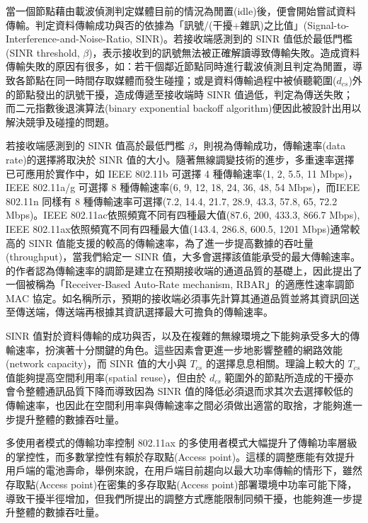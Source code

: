 \documentclass[12pt,a4paper]{article}
\begin{document}
\begin{description}
當一個節點藉由載波偵測判定媒體目前的情況為閒置(idle)後，便會開始嘗試資料傳輸。判定資料傳輸成功與否的依據為「訊號/(干擾+雜訊)之比值」(Signal-to-Interference-and-Noise-Ratio, SINR)。若接收端感測到的 SINR 值低於最低門檻(SINR threshold, $\beta$)，表示接收到的訊號無法被正確解讀導致傳輸失敗。造成資料傳輸失敗的原因有很多，如：若干個鄰近節點同時進行載波偵測且判定為閒置，導致各節點在同一時間存取媒體而發生碰撞；或是資料傳輸過程中被偵聽範圍($d_{cs}$)外的節點發出的訊號干擾，造成傳遞至接收端時 SINR 值過低，判定為傳送失敗；而二元指數後退演算法(binary exponential backoff algorithm)便因此被設計出用以解決競爭及碰撞的問題。

若接收端感測到的 SINR 值高於最低門檻 $\beta$，則視為傳輸成功，傳輸速率(data rate)的選擇將取決於 SINR 值的大小。隨著無線調變技術的進步，多重速率選擇已可應用於實作中，如 IEEE 802.11b 可選擇 4 種傳輸速率(1, 2, 5.5, 11 Mbps)，IEEE 802.11a/g 可選擇 8 種傳輸速率(6, 9, 12, 18, 24, 36, 48, 54 Mbps)，而IEEE 802.11n 同樣有 8 種傳輸速率可選擇(7.2, 14.4, 21.7, 28.9, 43.3, 57.8, 65, 72.2 Mbps)。IEEE 802.11ac依照頻寬不同有四種最大值(87.6, 200, 433.3, 866.7 Mbps), IEEE 802.11ax依照頻寬不同有四種最大值(143.4, 286.8, 600.5, 1201 Mbps)通常較高的 SINR 值能支援的較高的傳輸速率，為了進一步提高數據的吞吐量(throughput)，當我們給定一 SINR 值，大多會選擇該值能承受的最大傳輸速率。\cite{mobicom01_ramp}的作者認為傳輸速率的調節是建立在預期接收端的通道品質的基礎上，因此提出了一個被稱為「Receiver-Based Auto-Rate mechanism, RBAR」的適應性速率調節 MAC 協定。如名稱所示，預期的接收端必須事先計算其通道品質並將其資訊回送至傳送端，傳送端再根據其資訊選擇最大可擔負的傳輸速率。 

SINR 值對於資料傳輸的成功與否，以及在複雜的無線環境之下能夠承受多大的傳輸速率，扮演著十分關鍵的角色。這些因素會更進一步地影響整體的網路效能(network capacity)，而 SINR 值的大小與 $T_{cs}$ 的選擇息息相關。理論上較大的 $T_{cs}$ 值能夠提高空間利用率(spatial reuse)，但由於 $d_{cs}$ 範圍外的節點所造成的干擾亦會令整體通訊品質下降而導致因為 SINR 值的降低必須退而求其次去選擇較低的傳輸速率，也因此在空間利用率與傳輸速率之間必須做出適當的取捨，才能夠進一步提升整體的數據吞吐量。

\cite{33}多使用者模式的傳輸功率控制 802.11ax 的多使用者模式大幅提升了傳輸功率層級的掌控性，而多數掌控性有賴於存取點(Access point)。這樣的調整應能有效提升用戶端的電池壽命，舉例來說，在用戶端目前趨向以最大功率傳輸的情形下，雖然存取點(Access point)在密集的多存取點(Access point)部署環境中功率可能下降，導致干擾半徑增加，但我們所提出的調整方式應能限制同頻干擾，也能夠進一步提升整體的數據吞吐量。




\end{description}
\end{document}
